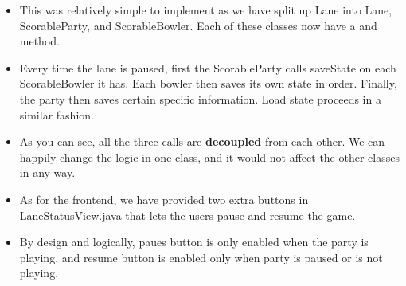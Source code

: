 \documentclass{article}
\begin{document}
\begin{itemize}
    \item This was relatively simple to implement as we have split up Lane into Lane, ScorableParty, and ScorableBowler. Each of these classes now have a  and  method.
    \item Every time the lane is paused, first the ScorableParty calls saveState on each ScorableBowler it has. Each bowler then saves its own state in order. Finally, the party then saves certain specific information. Load state proceeds in a similar fashion.
    \item As you can see, all the three  calls are \textbf{decoupled} from each other. We can happily change the logic in one class, and it would not affect the other classes in any way.
    \item As for the frontend, we have provided two extra buttons in LaneStatusView.java that lets the users pause and resume the game.
    \item By design and logically, paues button is only enabled when the party is playing, and resume button is enabled only when party is paused or is not playing.
\end{itemize}
\end{document}
